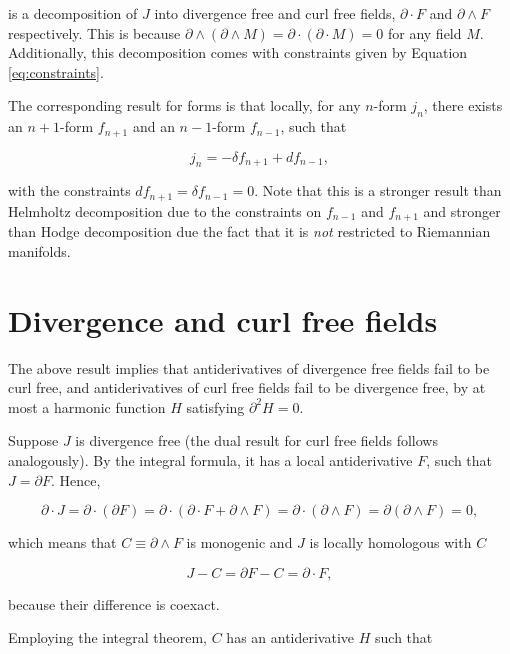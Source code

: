 \documentclass[twocolumn]{article}
\begin{document}
is a decomposition of $J$ into divergence free and curl free fields, $\partial \cdot F$ and $\partial \wedge F$ respectively. This is because $\partial \wedge (\partial \wedge M) = \partial \cdot (\partial \cdot M) = 0$ for any field $M$. Additionally, this decomposition comes with constraints given by Equation \ref{eq:constraints}.

The corresponding result for forms is that locally, for any $n$-form $j_n$, there exists an $n+1$-form $f_{n+1}$ and an $n-1$-form $f_{n-1}$, such that

\begin{equation}
  j_n = -\delta f_{n+1} + d f_{n-1},
\end{equation}

with the constraints $df_{n+1}=\delta f_{n-1} = 0$. Note that this is a stronger result than Helmholtz decomposition due to the constraints on $f_{n-1}$ and $f_{n+1}$ and stronger than Hodge decomposition due the fact that it is \emph{not} restricted to Riemannian manifolds.

\section{Divergence and curl free fields}

The above result implies that antiderivatives of divergence free fields fail to be curl free, and antiderivatives of curl free fields fail to be divergence free, by at most a harmonic function $H$ satisfying $\partial^2 H = 0$.

Suppose $J$ is divergence free (the dual result for curl free fields follows analogously). By the integral formula, it has a local antiderivative $F$, such that $J = \partial F$. Hence,

\begin{equation}
  \partial \cdot J = \partial \cdot (\partial F) = \partial \cdot (\partial \cdot F + \partial \wedge F) = \partial \cdot (\partial \wedge F) = \partial (\partial \wedge F) = 0,
\end{equation}

which means that $C \equiv \partial \wedge F$ is monogenic and $J$ is locally homologous with $C$

\begin{equation}
  J - C = \partial F - C = \partial \cdot F,\label{eq:homologous}
\end{equation}

because their difference is coexact.

Employing the integral theorem, $C$ has an antiderivative $H$ such that 
\end{document}
